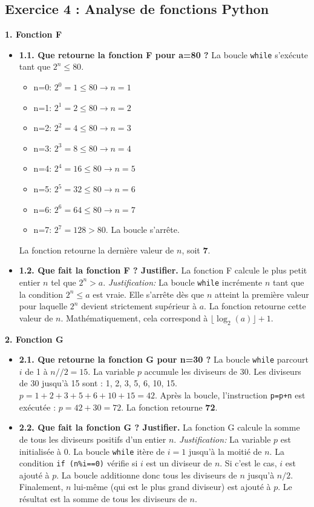 \documentclass[12pt]{article}
\begin{document}
\subsection*{Exercice 4 : Analyse de fonctions Python}
\textbf{1. Fonction F}
\begin{itemize}
    \item \textbf{1.1. Que retourne la fonction F pour a=80 ?}
    La boucle \texttt{while} s'exécute tant que $2^n \le 80$.
    \begin{itemize}
        \item n=0: $2^0=1 \le 80 \rightarrow n=1$
        \item n=1: $2^1=2 \le 80 \rightarrow n=2$
        \item n=2: $2^2=4 \le 80 \rightarrow n=3$
        \item n=3: $2^3=8 \le 80 \rightarrow n=4$
        \item n=4: $2^4=16 \le 80 \rightarrow n=5$
        \item n=5: $2^5=32 \le 80 \rightarrow n=6$
        \item n=6: $2^6=64 \le 80 \rightarrow n=7$
        \item n=7: $2^7=128 > 80$. La boucle s'arrête.
    \end{itemize}
    La fonction retourne la dernière valeur de $n$, soit \textbf{7}.
    
    \item \textbf{1.2. Que fait la fonction F ? Justifier.}
    La fonction F calcule le plus petit entier $n$ tel que $2^n > a$.
    \textit{Justification:} La boucle \texttt{while} incrémente $n$ tant que la condition $2^n \le a$ est vraie. Elle s'arrête dès que $n$ atteint la première valeur pour laquelle $2^n$ devient strictement supérieur à $a$. La fonction retourne cette valeur de $n$. Mathématiquement, cela correspond à $\lfloor \log_2(a) \rfloor + 1$.
\end{itemize}

\textbf{2. Fonction G}
\begin{itemize}
    \item \textbf{2.1. Que retourne la fonction G pour n=30 ?}
    La boucle \texttt{while} parcourt $i$ de 1 à $n//2=15$. La variable $p$ accumule les diviseurs de 30.
    Les diviseurs de 30 jusqu'à 15 sont : 1, 2, 3, 5, 6, 10, 15.
    $p = 1+2+3+5+6+10+15 = 42$.
    Après la boucle, l'instruction \texttt{p=p+n} est exécutée : $p = 42 + 30 = 72$.
    La fonction retourne \textbf{72}.
    
    \item \textbf{2.2. Que fait la fonction G ? Justifier.}
    La fonction G calcule la somme de tous les diviseurs positifs d'un entier $n$.
    \textit{Justification:} La variable $p$ est initialisée à 0. La boucle \texttt{while} itère de $i=1$ jusqu'à la moitié de $n$. La condition \texttt{if (n\%i==0)} vérifie si $i$ est un diviseur de $n$. Si c'est le cas, $i$ est ajouté à $p$. La boucle additionne donc tous les diviseurs de $n$ jusqu'à $n/2$. Finalement, $n$ lui-même (qui est le plus grand diviseur) est ajouté à $p$. Le résultat est la somme de tous les diviseurs de $n$.
\end{itemize}
\end{document}
